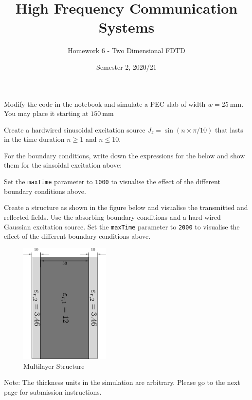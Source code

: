 \documentclass[addpoints]{exam}
\title{High Frequency Communication Systems}
\author{Homework 6 - Two Dimensional FDTD}
\date{Semester 2, 2020/21}
\begin{document}
\maketitle


\begin{questions}
    \pointsinrightmargin 
    \bracketedpoints
\question[3] Modify the code in the notebook and simulate a PEC slab of width  $w = \SI{25}{\mm}$. You may place it starting at $\SI{150}{\mm}$

\question[3] Create a hardwired sinusoidal excitation source $J_z = \sin(n\times\pi/10)$ that lasts in the time duration $n \ge 1$ and $n \le 10$.

\question
For the boundary conditions, write down the expressions for the below and show them for the sinsoidal excitation above:

    Set the \texttt{maxTime} parameter to \texttt{1000} to visualise the effect of the different boundary conditions above.

\question[5]

Create a structure as shown in the figure below and visualise the transmitted and reflected fields. Use the absorbing boundary conditions and a hard-wired Gaussian excitation source. Set the \texttt{maxTime} parameter to \texttt{2000} to visualise the effect of the different boundary conditions above.

\begin{figure}[htbp]
    \centering
    \includegraphics[width=0.4\textwidth]{homework_FDTD_problem3.pdf}
    \caption{Multilayer Structure}
\end{figure}

Note: The thickness units in the simulation are arbitrary. Please go to the next page for submission instructions.

\end{questions}
\end{document}
